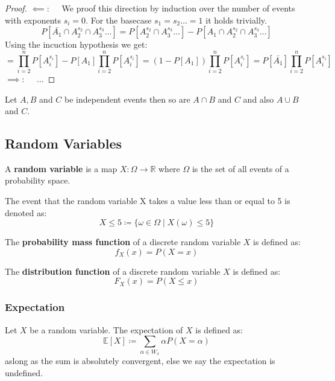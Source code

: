 \begin{proof}
	$\impliedby: \quad$ We proof this direction by induction over the number of events with exponents $s_i = 0$. For the basecase $s_1 = s_2 \dots = 1$ it holds trivially.
	$$P[\bar{A_1} \cap A_2^{s_2} \cap A_3^{s_3} \dots] = P[A_2^{s_2} \cap A_3^{s_3} \dots] - P[A_1 \cap A_2^{s_2} \cap A_3^{s_3} \dots]$$
	Using the incuction hypothesis we get:
	$$= \prod_{i=2}^n P[A_i^{s_i}] - P[A_1]\prod_{i=2}^n P[A_i^{s_i}] = (1-P[A_1])\prod_{i=2}^n P[A_i^{s_i}] = P[\bar{A_1}]\prod_{i=2}^n P[A_i^{s_i}]$$
	$\implies: \quad$ ...
\end{proof}

\begin{lemma}
	Let $A, B$ and $C$ be independent events then so are $A \cap B$ and $C$ and also $A \cup B$ and $C$.
\end{lemma}

\subsection{Random Variables}

\begin{definition}
	A \textbf{random variable } is a map $X: \Omega \to \mathbb{R}$ where $\Omega$ is the set of all events of a probability space.
\end{definition}

\begin{example}
	The event that the random variable X takes a value less than or equal to 5 is denoted as:
	$$X \leq 5 \coloneqq \{\omega \in \Omega \mid X(\omega) \leq 5\}$$
\end{example}

\begin{definition}
	The \textbf{probability mass function} of a discrete random variable $X$ is defined as:
	$$f_X(x) = P(X=x)$$
\end{definition}

\begin{definition}
	The \textbf{distribution function} of a discrete random variable $X$ is defined as:
	$$F_X(x) = P(X \leq x)$$
\end{definition}

\subsubsection{Expectation}

\begin{definition}
	Let $X$ be a random variable. The expectation of $X$ is defined as:
	$$
		\mathbb{E}[X] \coloneqq \sum_{\alpha \in W_x} \alpha P(X=\alpha)
	$$
	aslong as the sum is absolutely convergent, else we say the expectation is undefined.
\end{definition}

